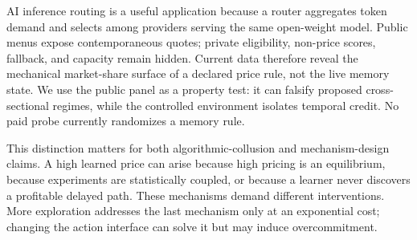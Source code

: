 \documentclass[10pt,twocolumn]{article}
\begin{document}
AI inference routing is a useful application because a router aggregates token
demand and selects among providers serving the same open-weight model.  Public
menus expose contemporaneous quotes; private eligibility, non-price scores,
fallback, and capacity remain hidden.  Current data therefore reveal the
mechanical market-share surface of a declared price rule, not the live memory
state.  We use the public panel as a property test: it can falsify proposed
cross-sectional regimes, while the controlled environment isolates temporal
credit.  No paid probe currently randomizes a memory rule.

This distinction matters for both algorithmic-collusion and mechanism-design
claims.  A high learned price can arise because high pricing is an equilibrium,
because experiments are statistically coupled, or because a learner never
discovers a profitable delayed path.  These mechanisms demand different
interventions.  More exploration addresses the last mechanism only at an
exponential cost; changing the action interface can solve it but may induce
overcommitment.
\end{document}
